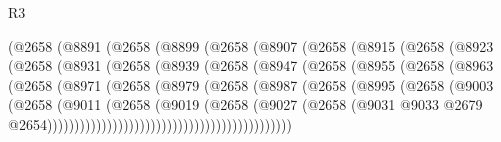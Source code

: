 \begin{lexlean}{R3}
\begin{coremodule}
                  (@2658
                    (@8891
                      (@2658
                        (@8899
                          (@2658
                            (@8907
                              (@2658
                                (@8915
                                  (@2658
                                    (@8923
                                      (@2658
                                        (@8931
                                          (@2658
                                            (@8939
                                              (@2658
                                                (@8947
                                                  (@2658
                                                    (@8955
                                                      (@2658
                                                        (@8963
                                                          (@2658
                                                            (@8971
                                                              (@2658
                                                                (@8979
                                                                  (@2658
                                                                    (@8987
                                                                      (@2658
                                                                        (@8995
                                                                          (@2658
                                                                            (@9003
                                                                              (@2658
                                                                                (@9011
                                                                                  (@2658
                                                                                    (@9019
                                                                                      (@2658
                                                                                        (@9027
                                                                                          (@2658
                                                                                            (@9031
                                                                                              @9033
                                                                                              @2679
                                                                                              @2654)))))))))))))))))))))))))))))))))))))))))))))

\end{coremodule}
\end{lexlean}
